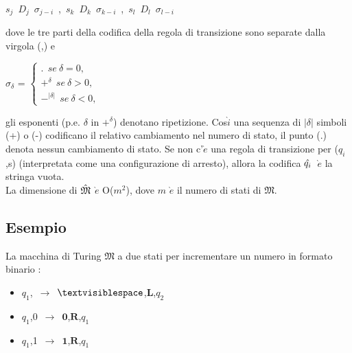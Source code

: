 \documentclass[a4paper]{article}
\theoremstyle{plain}
\theoremstyle{definition}
\begin{document}
	\vspace{3pt}
	\begin{center}
		$s_j$\ $D_j$\ $\sigma_{j-i}$\ ,\ $s_k$\ $D_k$\ $\sigma_{k-i}$\ ,\ $s_l$\ $D_l$\ $\sigma_{l-i}$\ 
	\end{center}
	\vspace{3pt}

	dove le tre parti della codifica della regola di transizione sono separate dalla virgola (,) e

	\vspace{3pt}
	\begin{center}

		$\sigma_{\delta}$ = $\left\{ \begin{array}{rcl} . \ \ se\ \delta = 0, \\ +^{\delta} \ \ se\ \delta > 0, \\ -^{|\delta|} \ \ se\ \delta < 0, \end{array}\right. $

	\end{center}
	\vspace{3pt}

	gli esponenti (p.e. $\delta$ in $+^{\delta}$) denotano ripetizione. 
	Cos$\grave{i}$ una sequenza di $|\delta|$ simboli (+) o (-) codificano il relativo cambiamento nel numero di stato, il punto (.) 
	denota nessun cambiamento di stato.
	Se non c'$\grave{e}$ una regola di transizione per (${q_i}$,s) (interpretata come una configurazione di arresto), allora la codifica
	$\Hat{q_i}$\ $\grave{e}$ la stringa vuota. 
	\\
	La dimensione di $\Hat{\mathfrak{M}}$ $\grave{e}$ O($m^2$), dove $m$ $\grave{e}$ il numero di stati di $\mathfrak{M}$.
	
	\subsection{Esempio}
	\label{sec:examples}
	La macchina di Turing $\mathfrak{M}$ a due stati per incrementare un numero in formato binario :

	\vspace{3pt}
		\begin{itemize}
			\item \begin{center}
			$q_1$,\textvisiblespace\ $\rightarrow$\ $\mathbf{\textvisiblespace}$,$\mathbf{L}$,$q_2$
			\end{center}
			\item  \begin{center}
			$q_1$,0\ $\rightarrow$\ $\mathbf{0}$,$\mathbf{R}$,$q_1$	
			\end{center}		
			\item \begin{center}
			$q_1$,1\ $\rightarrow$\ $\mathbf{1}$,$\mathbf{R}$,$q_1$
			\end{center}			
		\end{itemize}	
	\vspace{1pt}
\end{document}
